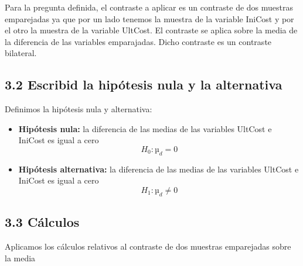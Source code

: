 \documentclass[
  a4paper]{article}
\newenvironment{Shaded}{\begin{snugshade}}{\end{snugshade}}
\newcommand{\AttributeTok}[1]{\textcolor[rgb]{0.77,0.63,0.00}{#1}}
\newcommand{\ConstantTok}[1]{\textcolor[rgb]{0.00,0.00,0.00}{#1}}
\newcommand{\DecValTok}[1]{\textcolor[rgb]{0.00,0.00,0.81}{#1}}
\newcommand{\FloatTok}[1]{\textcolor[rgb]{0.00,0.00,0.81}{#1}}
\newcommand{\FunctionTok}[1]{\textcolor[rgb]{0.00,0.00,0.00}{#1}}
\newcommand{\NormalTok}[1]{#1}
\newcommand{\OtherTok}[1]{\textcolor[rgb]{0.56,0.35,0.01}{#1}}
\newcommand{\SpecialCharTok}[1]{\textcolor[rgb]{0.00,0.00,0.00}{#1}}
\providecommand{\tightlist}{%
  \setlength{\itemsep}{0pt}\setlength{\parskip}{0pt}}
\begin{document}
Para la pregunta definida, el contraste a aplicar es un contraste de dos
muestras emparejadas ya que por un lado tenemos la muestra de la
variable IniCost y por el otro la muestra de la variable UltCost. El
contraste se aplica sobre la media de la diferencia de las variables
emparajadas. Dicho contraste es un contraste bilateral.

\hypertarget{escribid-la-hipuxf3tesis-nula-y-la-alternativa}{%
\subsection{3.2 Escribid la hipótesis nula y la
alternativa}\label{escribid-la-hipuxf3tesis-nula-y-la-alternativa}}

Definimos la hipótesis nula y alternativa:

\begin{itemize}
\tightlist
\item
  \textbf{Hipótesis nula:} la diferencia de las medias de las variables
  UltCost e IniCost es igual a cero \[H_0: µ_d = 0\]
\item
  \textbf{Hipótesis alternativa:} la diferencia de las medias de las
  variables UltCost e IniCost es igual a cero \[H_1: µ_d ≠ 0\]
\end{itemize}

\hypertarget{cuxe1lculos}{%
\subsection{3.3 Cálculos}\label{cuxe1lculos}}

Aplicamos los cálculos relativos al contraste de dos muestras
emparejadas sobre la media

\begin{Shaded}
\end{Shaded}
\end{document}
